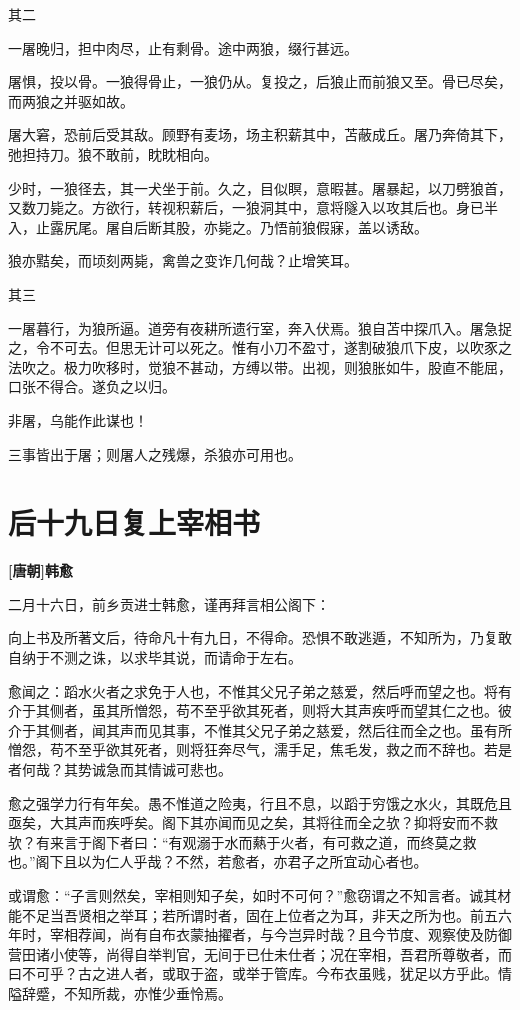 \documentclass[UTF8,titlepage,oneside]{ctexbook}
\begin{document}
其二

一屠晚归，担中肉尽，止有剩骨。途中两狼，缀行甚远。

屠惧，投以骨。一狼得骨止，一狼仍从。复投之，后狼止而前狼又至。骨已尽矣，而两狼之并驱如故。

屠大窘，恐前后受其敌。顾野有麦场，场主积薪其中，苫蔽成丘。屠乃奔倚其下，弛担持刀。狼不敢前，眈眈相向。

少时，一狼径去，其一犬坐于前。久之，目似瞑，意暇甚。屠暴起，以刀劈狼首，又数刀毙之。方欲行，转视积薪后，一狼洞其中，意将隧入以攻其后也。身已半入，止露尻尾。屠自后断其股，亦毙之。乃悟前狼假寐，盖以诱敌。

狼亦黠矣，而顷刻两毙，禽兽之变诈几何哉？止增笑耳。


其三

一屠暮行，为狼所逼。道旁有夜耕所遗行室，奔入伏焉。狼自苫中探爪入。屠急捉之，令不可去。但思无计可以死之。惟有小刀不盈寸，遂割破狼爪下皮，以吹豕之法吹之。极力吹移时，觉狼不甚动，方缚以带。出视，则狼胀如牛，股直不能屈，口张不得合。遂负之以归。

非屠，乌能作此谋也！

三事皆出于屠；则屠人之残爆，杀狼亦可用也。



\chapter*{后十九日复上宰相书}
\begin{center}
	\textbf{[唐朝]韩愈}
\end{center}

二月十六日，前乡贡进士韩愈，谨再拜言相公阁下：

向上书及所著文后，待命凡十有九日，不得命。恐惧不敢逃遁，不知所为，乃复敢自纳于不测之诛，以求毕其说，而请命于左右。

愈闻之：蹈水火者之求免于人也，不惟其父兄子弟之慈爱，然后呼而望之也。将有介于其侧者，虽其所憎怨，苟不至乎欲其死者，则将大其声疾呼而望其仁之也。彼介于其侧者，闻其声而见其事，不惟其父兄子弟之慈爱，然后往而全之也。虽有所憎怨，苟不至乎欲其死者，则将狂奔尽气，濡手足，焦毛发，救之而不辞也。若是者何哉？其势诚急而其情诚可悲也。

愈之强学力行有年矣。愚不惟道之险夷，行且不息，以蹈于穷饿之水火，其既危且亟矣，大其声而疾呼矣。阁下其亦闻而见之矣，其将往而全之欤？抑将安而不救欤？有来言于阁下者曰：“有观溺于水而爇于火者，有可救之道，而终莫之救也。”阁下且以为仁人乎哉？不然，若愈者，亦君子之所宜动心者也。

或谓愈：“子言则然矣，宰相则知子矣，如时不可何？”愈窃谓之不知言者。诚其材能不足当吾贤相之举耳；若所谓时者，固在上位者之为耳，非天之所为也。前五六年时，宰相荐闻，尚有自布衣蒙抽擢者，与今岂异时哉？且今节度、观察使及防御营田诸小使等，尚得自举判官，无间于已仕未仕者；况在宰相，吾君所尊敬者，而曰不可乎？古之进人者，或取于盗，或举于管库。今布衣虽贱，犹足以方乎此。情隘辞蹙，不知所裁，亦惟少垂怜焉。
\end{document}
